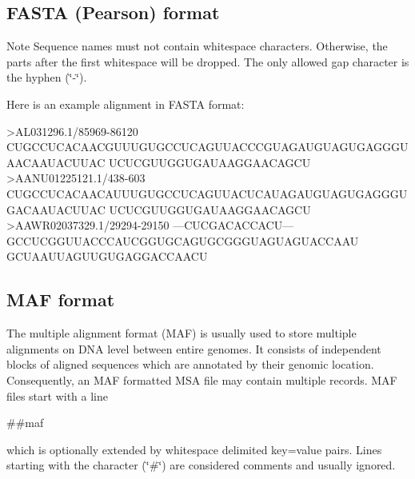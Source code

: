 \hypertarget{file_formats_msa-formats-fasta}{}\subsection{F\+A\+S\+T\+A (\+Pearson) format}\label{file_formats_msa-formats-fasta}
\begin{DoxyNote}{Note}
Sequence names must not contain whitespace characters. Otherwise, the parts after the first whitespace will be dropped. The only allowed gap character is the hyphen {\itshape }(\char`\"{}-\/\char`\"{}).
\end{DoxyNote}
Here is an example alignment in F\+A\+S\+TA format\+: \begin{DoxyVerb}>AL031296.1/85969-86120
CUGCCUCACAACGUUUGUGCCUCAGUUACCCGUAGAUGUAGUGAGGGUAACAAUACUUAC
UCUCGUUGGUGAUAAGGAACAGCU
>AANU01225121.1/438-603
CUGCCUCACAACAUUUGUGCCUCAGUUACUCAUAGAUGUAGUGAGGGUGACAAUACUUAC
UCUCGUUGGUGAUAAGGAACAGCU
>AAWR02037329.1/29294-29150
---CUCGACACCACU---GCCUCGGUUACCCAUCGGUGCAGUGCGGGUAGUAGUACCAAU
GCUAAUUAGUUGUGAGGACCAACU\end{DoxyVerb}
\hypertarget{file_formats_msa-formats-maf}{}\subsection{M\+A\+F format}\label{file_formats_msa-formats-maf}
The multiple alignment format (M\+AF) is usually used to store multiple alignments on D\+NA level between entire genomes. It consists of independent blocks of aligned sequences which are annotated by their genomic location. Consequently, an M\+AF formatted M\+SA file may contain multiple records. M\+AF files start with a line \begin{DoxyVerb}##maf
\end{DoxyVerb}
 which is optionally extended by whitespace delimited key=value pairs. Lines starting with the character (\char`\"{}\#\char`\"{}) are considered comments and usually ignored.

